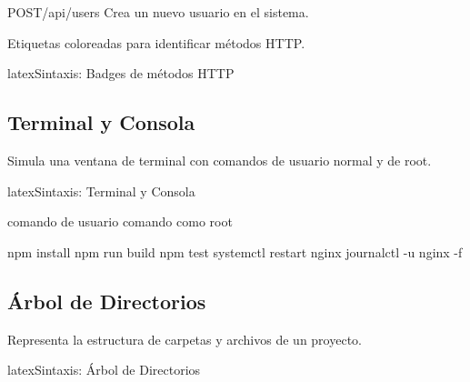 \vspace{1em}

\begin{apiendpoint}{POST}{/api/users}
  Crea un nuevo usuario en el sistema.

\end{apiendpoint}

Etiquetas coloreadas para identificar métodos HTTP.

\begin{codigosimple}{latex}{Sintaxis: Badges de métodos HTTP}
\httpget \httppost \httpput \httppatch \httpdelete
\end{codigosimple}

\noindent
\httpget \quad \httppost \quad \httpput \quad \httppatch \quad \httpdelete

\subsection{Terminal y Consola}
\label{subsec:terminal}

Simula una ventana de terminal con comandos de usuario normal y de root.

\begin{codigosimple}{latex}{Sintaxis: Terminal y Consola}
\begin{terminal}
  \prompt comando de usuario
  \promptroot comando como root
\end{terminal}
\end{codigosimple}

\begin{terminal}
  \prompt npm install
  \prompt npm run build
  \prompt npm test
  \promptroot systemctl restart nginx
  \promptroot journalctl -u nginx -f
\end{terminal}

\subsection{Árbol de Directorios}
\label{subsec:dirtree}

Representa la estructura de carpetas y archivos de un proyecto.

\begin{codigosimple}{latex}{Sintaxis: Árbol de Directorios}
\begin{dirtreebox}[Título]
\end{dirtreebox}
\end{codigosimple}

